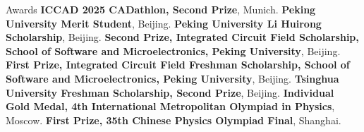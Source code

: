 \begin{rubric}{Awards}
\entry*[2025]%
	\textbf{ICCAD 2025 CADathlon, Second Prize}, Munich.
%
\entry*[2025]%
	\textbf{Peking University Merit Student}, Beijing.
%
\entry*[2025]%
	\textbf{Peking University Li Huirong Scholarship}, Beijing.
%
\entry*[2025]%
	\textbf{Second Prize, Integrated Circuit Field Scholarship, School of Software and Microelectronics, Peking University}, Beijing.
%
\entry*[2024]%
	\textbf{First Prize, Integrated Circuit Field Freshman Scholarship, School of Software and Microelectronics, Peking University}, Beijing.
%
\entry*[2020]%
	\textbf{Tsinghua University Freshman Scholarship, Second Prize}, Beijing.
%
\entry*[2019]%
	\textbf{Individual Gold Medal, 4th International Metropolitan Olympiad in Physics}, Moscow.
%
\entry*[2018]%
	\textbf{First Prize, 35th Chinese Physics Olympiad Final}, Shanghai.
\end{rubric}
